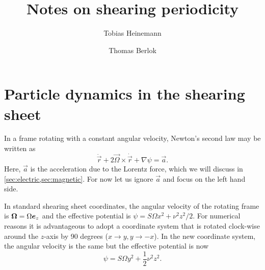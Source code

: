 \documentclass[aps,pre,notitlepage,amsmath,amssymb,amsfonts,nobibnotes,nofootinbib,superscriptaddress,onecolumn,a4paper,10pt]{revtex4-1}
\begin{document}
\title{Notes on shearing periodicity}
\author{Tobias Heinemann}
\author{Thomas Berlok}
\maketitle

\section{Particle dynamics in the shearing sheet}

In a frame rotating with a constant angular velocity, Newton's second law may
be written as
\begin{equation}
  \label{eq:eom}
  \ddot{\vec{r}} + 2\vec{\Omega}\times\dot{\vec{r}} + \nabla\psi = \vec{a}.
\end{equation}
Here, $\vec{a}$ is the acceleration due to the Lorentz force, which we will
discuss in \cref{sec:electric,sec:magnetic}. For now let us ignore $\vec{a}$
and focus on the left hand side.

In standard shearing sheet coordinates, the angular velocity of the rotating
frame is $\bm{\Omega}=\Omega\bm{e}_z$ and the effective potential is
$\psi=S\Omega x^2 + \nu^2 z^2/2$. For numerical reasons it is advantageous to
adopt a coordinate system that is rotated clock-wise around the $z$-axis by 90
degrees ($x\to y, y\to-x$). In the new coordinate system, the angular velocity
is the same but the effective potential is now
\begin{equation}
  \label{eq:effective-potential}
  \psi = S\Omega y^2 + \frac{1}{2}\nu^2 z^2.
\end{equation}
\end{document}
